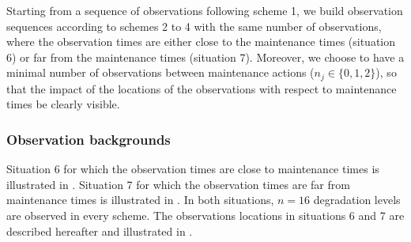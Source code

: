Starting from a sequence of observations following scheme 1, we  build observation sequences according to schemes 2 to 4 with the same number of observations, where the observation times are either close to the maintenance times (situation 6) or far from the maintenance times (situation 7). 
Moreover, we choose to have a minimal number of observations between maintenance actions ($n_j \in \{0,1,2\}$), so that the impact of the locations of the observations with respect to maintenance times be clearly visible.


\subsubsection{Observation backgrounds}
Situation 6 for which the observation times are close to maintenance times is illustrated in .
Situation 7 for which the observation times are far from maintenance times is illustrated in .
In both situations, $n=16$ degradation levels are observed in every scheme.
The observations locations in situations 6 and 7 are described hereafter and illustrated in .

